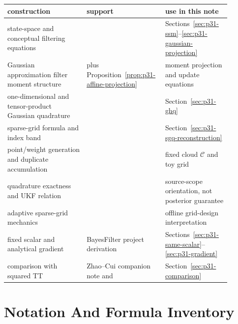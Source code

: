 \documentclass[11pt]{article}
\numberwithin{equation}{section}
\begin{document}
\begin{center}
\small
\begin{tabular}{p{0.34\linewidth}p{0.28\linewidth}p{0.28\linewidth}}
\toprule
construction & support & use in this note \\
\midrule
state-space and conceptual filtering equations & \citet[Section 2]{jia2012sparsegrid} & Sections~\ref{sec:p31-ssm}--\ref{sec:p31-gaussian-projection} \\
Gaussian approximation filter moment structure & \citet[Eq. 15--23]{jia2012sparsegrid} plus Proposition~\ref{prop:p31-affine-projection} & moment projection and update equations \\
one-dimensional and tensor-product Gaussian quadrature & \citet[Section 2.2.1]{jia2012sparsegrid} & Section~\ref{sec:p31-ghq} \\
sparse-grid formula and index band & \citet[Eq. 26--29]{jia2012sparsegrid} & Section~\ref{sec:p31-sgq-reconstruction} \\
point/weight generation and duplicate accumulation & \citet[Algorithm 1]{jia2012sparsegrid} & fixed cloud \(\mathcal C\) and toy grid \\
quadrature exactness and UKF relation & \citet[Theorems 3.1--3.2]{jia2012sparsegrid} & source-scope orientation, not posterior guarantee \\
adaptive sparse-grid mechanics & \citet[Section 3]{singh2018adaptive} & offline grid-design interpretation \\
fixed scalar and analytical gradient & BayesFilter project derivation & Sections~\ref{sec:p31-same-scalar}--\ref{sec:p31-gradient} \\
comparison with squared TT & Zhao--Cui companion note and \citet{zhao2024ttsequential} & Section~\ref{sec:p31-comparison} \\
\bottomrule
\end{tabular}
\end{center}

\section{Notation And Formula Inventory}
\label{sec:p32-final-inventory}
\end{document}

